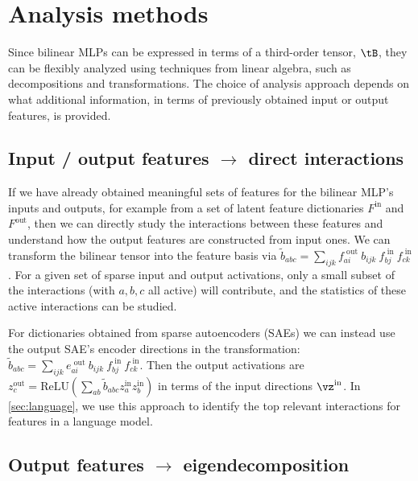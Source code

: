 \documentclass{article} %
\begin{document}


\section{Analysis methods} \label{sec:method}

Since bilinear MLPs can be expressed in terms of a third-order tensor, $\tB$, they can be flexibly analyzed using techniques from linear algebra, such as decompositions and transformations. The choice of analysis approach depends on what additional information, in terms of previously obtained input or output features, is provided. 


\subsection{Input / output features $\rightarrow$ direct interactions}
If we have already obtained meaningful sets of features for the bilinear MLP's inputs and outputs, for example from a set of latent feature dictionaries $F^\text{in}$ and $F^\text{out}$, then we can directly study the interactions between these features and understand how the output features are constructed from input ones.  We can transform the bilinear tensor into the feature basis via $\tilde{b}_{abc} = \sum_{ijk} f^\text{\ out}_{ai} \ b_{ijk} \ f^\text{\ in}_{bj} \  f^\text{\ in}_{ck}$. For a given set of sparse input and output activations, only a small subset of the interactions (with $a,b,c$ all active) will contribute, and the statistics of these active interactions can be studied. 

For dictionaries obtained from sparse autoencoders (SAEs) we can instead use the output SAE's encoder directions in the transformation: $\tilde{b}_{abc} = \sum_{ijk} e^\text{\ out}_{ai} \ b_{ijk} \ f^\text{\ in}_{bj} \  f^\text{\ in}_{ck}$. Then the output activations are $z^\text{out}_c = \text{ReLU}(\sum_{ab} \tilde{b}_{abc} z^\text{in}_a z^\text{in}_b)$ in terms of the input directions $\vz^\text{in}$. In \autoref{sec:language}, we use this approach to identify the top relevant interactions for features in a language model.

\subsection{Output features $\rightarrow$ eigendecomposition} \label{sub:decomposition}
\end{document}
